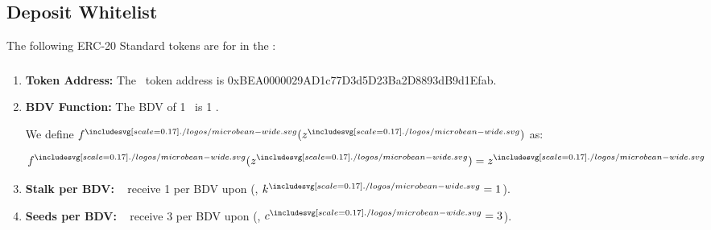 \documentclass[class=article, crop=false]{standalone}
\begin{document}
\subsection{Deposit Whitelist}
The following ERC-20 Standard tokens are  for  in the :
\subsubsection{\Bean}
    \begin{enumerate}
        \item \textbf{Token Address:} The \Bean\ token address is 0xBEA0000029AD1c77D3d5D23Ba2D8893dB9d1Efab.
        \item \textbf{BDV Function:} The BDV of 1 \Bean\ is 1 \Bean. 

        We define $f^{\bean}(z^{\bean})$ as:
        
        $$f^{\bean}(z^{\bean}) = z^{\bean}$$
            
        \item \textbf{Stalk per BDV:} \Bean\  receive 1  per BDV upon  (, $k^{\bean} = 1$).
        \item \textbf{Seeds per BDV:} \Bean\  receive 3  per BDV upon  (, $c^{\bean} = 3$).
    \end{enumerate}
\end{document}
